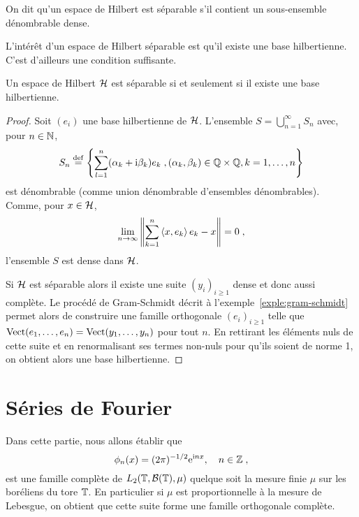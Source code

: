 \begin{definition}
  On dit qu'un espace de Hilbert est s\'{e}parable s'il contient un sous-ensemble
  d\'{e}nombrable dense.
\end{definition}

L'int\'{e}r\^{e}t d'un espace de Hilbert s\'{e}parable est qu'il existe une base
hilbertienne. C'est d'ailleurs une condition suffisante.

\begin{theorem}
Un espace de Hilbert $\mathcal{H}$ est s\'{e}parable si et seulement si il existe une
base hilbertienne.
\end{theorem}
\begin{proof}
Soit $(e_i)$ une base hilbertienne de $\mathcal{H}$.
L'ensemble $S= \bigcup_{n=1}^\infty S_n$ avec, pour $n \in \mathbb{N}$,
\[
S_n \stackrel{\mathrm{def}}{=} \left\{ \sum_{l=1}^n (\alpha_k + \mathrm{i} \beta_k) e_k \;, (\alpha_k,\beta_k) \in \mathbb{Q} \times \mathbb{Q}, k=1,\dots,n  \right\}
\]
est d\'{e}nombrable (comme union d\'{e}nombrable d'ensembles d\'{e}nombrables).
Comme, pour $x \in \mathcal{H}$,
\[
\lim_{n \to \infty} \left\| \sum_{k=1}^n \left\langle x, e_k \right\rangle e_k - x \right\| = 0 \;,
\]
l'ensemble $S$ est dense dans $\mathcal{H}$.

Si $\mathcal{H}$ est s\'{e}parable alors il existe une suite $(y_i)_{i\geq1}$ dense et
donc aussi compl\`{e}te. Le proc\'{e}d\'{e} de Gram-Schmidt d\'{e}crit \`{a}
l'exemple~\ref{exple:gram-schmidt} permet alors de construire une famille
orthogonale $(e_i)_{i\geq1}$ telle que
$\mathrm{Vect}(e_1,\dots,e_n)=\mathrm{Vect}(y_1,\dots,y_n)$ pour tout $n$. En rettirant les
\'{e}l\'{e}ments nuls de cette suite et en renormalisant ses termes non-nuls pour
qu'ils soient de norme 1, on obtient alors une base hilbertienne.

\end{proof}

\section{S\'{e}ries de Fourier}
\label{sec:serie-fourier}

Dans cette partie, nous allons \'{e}tablir que
\begin{equation}
  \label{eq:expo_complex}
\phi_n(x)= (2 \pi)^{-1/2} \mathrm{e}^{\mathrm{i} n x},\quad n \in \mathbb{Z}\;,
\end{equation}
est une famille
compl\`{e}te de $L_2(\mathbb{T},\mathcal{B}(\mathbb{T}),\mu)$ quelque soit la mesure
finie $\mu$ sur les bor\'{e}liens du tore $\mathbb{T}$.
En particulier si $\mu$ est proportionnelle \`{a} la mesure de Lebesgue, on obtient
que cette suite forme une famille
orthogonale compl\`{e}te.

